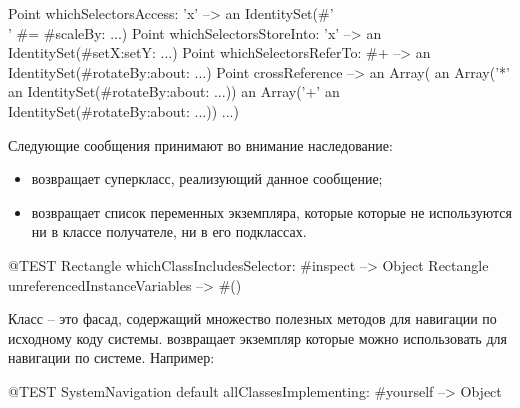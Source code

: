 \documentclass[a4paper,10pt,twoside]{book}
\begin{document}
{\begin{code}{} %
Point whichSelectorsAccess: 'x'    --> an IdentitySet(#'\\' #= #scaleBy: ...)
Point whichSelectorsStoreInto: 'x' --> an IdentitySet(#setX:setY: ...)
Point whichSelectorsReferTo: #+  --> an IdentitySet(#rotateBy:about: ...)
Point crossReference --> an Array(
		an Array('*' an IdentitySet(#rotateBy:about: ...))
		an Array('+' an IdentitySet(#rotateBy:about: ...))
		...)
\end{code}

Следующие сообщения принимают во внимание наследование:
\begin{itemize}
\item {} возвращает суперкласс, реализующий данное сообщение;
\item {} возвращает список переменных экземпляра, которые которые не используются ни в классе получателе, ни в его подклассах.
\end{itemize}

\begin{code}{@TEST}
Rectangle whichClassIncludesSelector: #inspect --> Object
Rectangle unreferencedInstanceVariables            --> #()
\end{code}

Класс  -- это фасад, содержащий множество полезных методов для навигации по исходному коду системы.
  возвращает экземпляр которые можно использовать для навигации по системе.
Например:

\begin{code}{@TEST}
SystemNavigation default allClassesImplementing: #yourself --> {Object}
\end{code}

}
\end{document}
